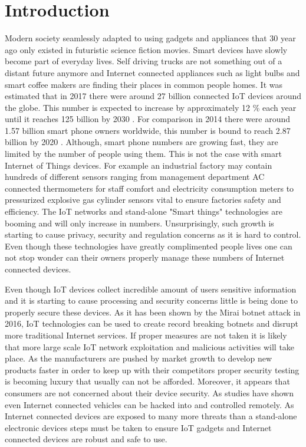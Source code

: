 \section{Introduction}

Modern society seamlessly adapted to using gadgets and appliances that 30 year ago only existed in futuristic science fiction movies. Smart devices have slowly become part of everyday lives. Self driving trucks are not something out of a distant future anymore\cite{freedman_2017} and Internet connected appliances such as light bulbs and  smart coffee makers are finding their places in common people homes. It was estimated that in 2017 there were around 27 billion connected IoT devices around the globe. This number is expected to increase by approximately 12 \% each year until it reaches 125 billion by 2030 \cite{ihs-markit}. For comparison in 2014 there were around 1.57 billion smart phone owners worldwide, this number is bound to reach 2.87 billion by 2020 \cite{statista}. Although, smart phone numbers are growing fast, they are limited by the number of people using them. This is not the case with smart Internet of Things devices. For example an industrial factory may contain hundreds of different sensors ranging from management department AC connected thermometers for staff comfort and electricity consumption meters to pressurized explosive gas cylinder sensors vital to ensure factories safety and efficiency. The IoT networks and stand-alone "Smart things" technologies are booming \cite{gartner2018} and will only increase in numbers. Unsurprisingly, such growth is starting to cause privacy, security and regulation concerns as it is hard to control. Even though these technologies have greatly complimented people lives one can not stop wonder can their owners properly manage these numbers of Internet connected devices.

Even though IoT devices collect incredible amount of users sensitive information and it is starting to cause processing and security concerns \cite{7069995} little is being done to properly secure these devices. As it has been shown by the Mirai botnet attack in 2016, IoT technologies can be used to create record breaking botnets and disrupt more traditional Internet services\cite{203628}. If proper measures are not taken it is likely that more large scale IoT network exploitation and malicious activities will take place. As the manufacturers are pushed by market growth to develop new products faster in order to keep up with their competitors proper security testing is becoming luxury that usually can not be afforded. Moreover, it appears that consumers are not concerned about their device security\cite{iotm}. As studies have shown even Internet connected vehicles can be hacked into and controlled remotely\cite{8071577}. As Internet connected devices are exposed to many more threats than a stand-alone electronic devices steps must be taken to ensure IoT gadgets and Internet connected devices are robust and safe to use.

